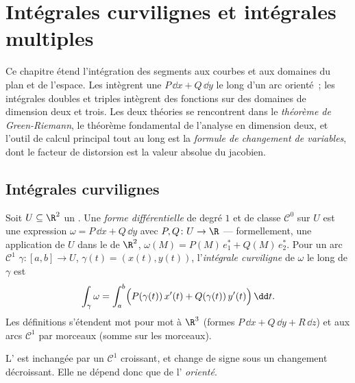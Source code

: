 \chapter{Intégrales curvilignes et intégrales multiples}\label{ch:b2:multint}

Ce chapitre étend l'intégration des segments aux courbes et aux
domaines du plan et de l'espace. Les  intègrent
une \emph{} $P\,\dd x + Q\,\dd y$ le long d'un arc
orienté~; les intégrales doubles et triples intègrent des fonctions sur
des domaines de dimension deux et trois. Les deux théories se
rencontrent dans le \emph{théorème de Green-Riemann}, le théorème
fondamental de l'analyse en dimension deux, et l'outil de calcul
principal tout au long est la \emph{formule de changement de
variables}, dont le facteur de distorsion est la valeur absolue du
 jacobien.

\section{Intégrales curvilignes}

\begin{definition}\label{def:b2:multint:lineint}
Soit $U \subseteq \R^2$ un . Une \emph{forme
différentielle} de
degré $1$ et de classe $\mathcal{C}^0$ sur $U$ est une expression
$\omega = P\,\dd x + Q\,\dd y$ avec $P, Q \colon U \to \R$
 --- formellement, une application  de $U$ dans le
 de $\R^2$, $\omega(M) = P(M)\,e_1^* + Q(M)\,e_2^*$. Pour un
arc $\mathcal{C}^1$ $\gamma \colon [a, b] \to U$, $\gamma(t) =
(x(t), y(t))$, l'\emph{intégrale curviligne} de
$\omega$ le long de $\gamma$
est
\[
\int_\gamma \omega
= \int_a^b \Bigl(P(\gamma(t))\,x'(t)
+ Q(\gamma(t))\,y'(t)\Bigr)\,\dd t .
\]
Les définitions s'étendent mot pour mot à $\R^3$ (formes $P\,\dd x +
Q\,\dd y + R\,\dd z$) et aux arcs $\mathcal{C}^1$ par morceaux (somme
sur les morceaux).
\end{definition}

\begin{proposition}\label{prop:b2:multint:lineinv}
L' est inchangée par un 
$\mathcal{C}^1$ croissant, et change de signe sous un changement
décroissant. Elle ne dépend donc que de l'
\emph{orienté}.
\end{proposition}

